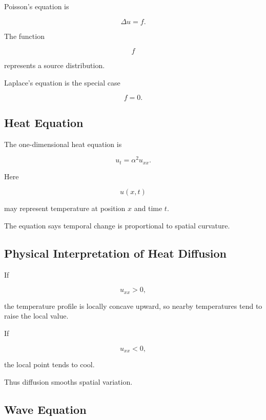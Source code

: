 Poisson's equation is

\[
\boxed{
\Delta u
=
f.
}
\]

The function

\[
f
\]

represents a source distribution.

Laplace's equation is the special case

\[
\boxed{
f=0.
}
\]

\subsection{Heat Equation}
\label{subsec:heat-equation}

The one-dimensional heat equation is

\[
\boxed{
u_t
=
\alpha^2u_{xx}.
}
\]

Here

\[
u(x,t)
\]

may represent temperature at position \(x\) and time \(t\).

The equation says temporal change is proportional to spatial curvature.

\subsection{Physical Interpretation of Heat Diffusion}
\label{subsec:heat-physical-interpretation}

If

\[
u_{xx}>0,
\]

the temperature profile is locally concave upward, so nearby temperatures
tend to raise the local value.

If

\[
u_{xx}<0,
\]

the local point tends to cool.

Thus diffusion smooths spatial variation.

\subsection{Wave Equation}
\label{subsec:wave-equation}

